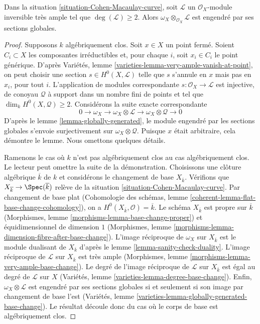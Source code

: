 \begin{lemma}
\label{lemma-tensor-omega-with-globally-generated-invertible}
Dans la situation \ref{situation-Cohen-Macaulay-curve}, soit $\mathcal{L}$ un $\mathcal{O}_X$-module inversible très ample tel que $\deg(\mathcal{L}) \geq 2$. Alors $\omega_X \otimes_{\mathcal{O}_X} \mathcal{L}$ est engendré par ses sections globales.
\end{lemma}

\begin{proof}
Supposons $k$ algébriquement clos. Soit $x \in X$ un point fermé. Soient $C_i \subset X$ les composantes irréductibles et, pour chaque $i$, soit $x_i \in C_i$ le point générique. D'après Variétés, lemme \ref{varieties-lemma-very-ample-vanish-at-point}, on peut choisir une section $s \in H^0(X, \mathcal{L})$ telle que $s$ s'annule en $x$ mais pas en $x_i$, pour tout $i$. L'application de modules correspondante $s : \mathcal{O}_X \to \mathcal{L}$ est injective, de conoyau $\mathcal{Q}$ à support dans un nombre fini de points et tel que $\dim_k H^0(X, \mathcal{Q}) \geq 2$. Considérons la suite exacte correspondante $$
0 \to \omega_X \to \omega_X \otimes \mathcal{L} \to
\omega_X \otimes \mathcal{Q} \to 0
$$ D'après le lemme \ref{lemma-globally-generated}, le module engendré par les sections globales s'envoie surjectivement sur $\omega_X \otimes \mathcal{Q}$. Puisque $x$ était arbitraire, cela démontre le lemme. Nous omettons quelques détails.

\medskip\noindent
Ramenons le cas où $k$ n'est pas algébriquement clos au cas algébriquement clos. Le lecteur peut omettre la suite de la démonstration. Choisissons une clôture algébrique $\overline{k}$ de $k$ et considérons le changement de base $X_{\overline{k}}$. Vérifions que $X_{\overline{k}} \to \Spec(\overline{k})$ relève de la situation \ref{situation-Cohen-Macaulay-curve}. Par changement de base plat (Cohomologie des schémas, lemme \ref{coherent-lemma-flat-base-change-cohomology}), on a $H^0(X_{\overline{k}}, \mathcal{O}) = \overline{k}$. Le schéma $X_{\overline{k}}$ est propre sur $\overline{k}$ (Morphismes, lemme \ref{morphisms-lemma-base-change-proper}) et équidimensionnel de dimension $1$ (Morphismes, lemme \ref{morphisms-lemma-dimension-fibre-after-base-change}). L'image réciproque de $\omega_X$ sur $X_{\overline{k}}$ est le module dualisant de $X_{\overline{k}}$ d'après le lemme \ref{lemma-sanity-check-duality}. L'image réciproque de $\mathcal{L}$ sur $X_{\overline{k}}$ est très ample (Morphismes, lemme \ref{morphisms-lemma-very-ample-base-change}). Le degré de l'image réciproque de $\mathcal{L}$ sur $X_{\overline{k}}$ est égal au degré de $\mathcal{L}$ sur $X$ (Variétés, lemme \ref{varieties-lemma-degree-base-change}). Enfin, $\omega_X \otimes \mathcal{L}$ est engendré par ses sections globales si et seulement si son image par changement de base l'est (Variétés, lemme \ref{varieties-lemma-globally-generated-base-change}). Le résultat découle donc du cas où le corps de base est algébriquement clos.
\end{proof}




